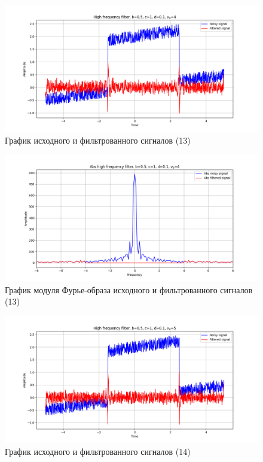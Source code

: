 \documentclass[a4paper, 12pt]{article}
\begin{document}
    \begin{figure}[!htb]
        \centering
        \includegraphics[scale=0.48]{13_u_flt_u_nolow.png}
        \captionsetup{skip=0pt}
        \caption{График исходного и фильтрованного сигналов (13)}
        \label{fig:fig51}
    \end{figure}
    \begin{figure}[!htb]
        \centering
        \includegraphics[scale=0.48]{13_abs_u_U_nolow.png}
        \captionsetup{skip=0pt}
        \caption{График модуля Фурье-образа исходного и фильтрованного сигналов (13)}
        \label{fig:fig52}
    \end{figure}
    \newpage
    \begin{figure}[!htb]
        \centering
        \includegraphics[scale=0.48]{14_u_flt_u_nolow.png}
        \captionsetup{skip=0pt}
        \caption{График исходного и фильтрованного сигналов (14)}
        \label{fig:fig53}
    \end{figure}
\end{document}
